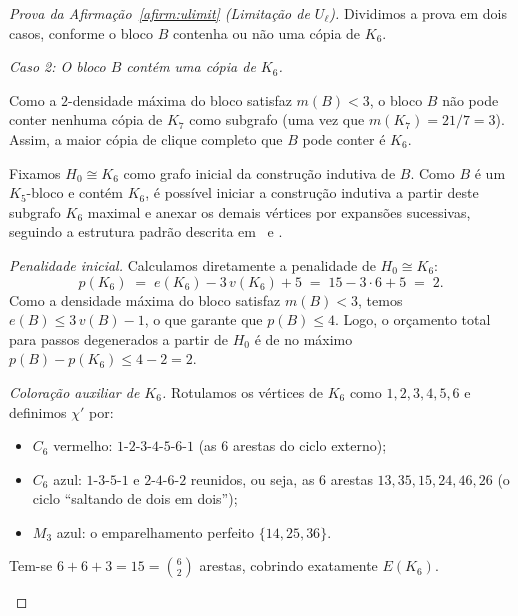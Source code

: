 \documentclass[reqno, 12pt]{amsart}
\numberwithin{equation}{section}
\theoremstyle{plain}
\theoremstyle{definition}
\newcommand{\maxdens}{m}
\begin{document}
\begin{proof}[Prova da Afirmação~\ref{afirm:ulimit} (Limitação de $U_\ell$)]
    Dividimos a prova em dois casos, conforme o bloco $B$ contenha ou não uma cópia de $K_6$.

    \medskip
    \noindent\textit{Caso 2: O bloco $B$ contém uma cópia de $K_6$.}

    \medskip

    Como a $2$-densidade máxima do bloco satisfaz $\maxdens(B) < 3$, o bloco $B$ não pode conter nenhuma cópia de $K_7$ como subgrafo (uma vez que $m(K_7) = 21/7 = 3$). Assim, a maior cópia de clique completo que $B$ pode conter é $K_6$.

    Fixamos $H_0 \cong K_6$ como grafo inicial da construção indutiva de $B$. Como $B$ é um $K_5$-bloco e contém $K_6$, é possível iniciar a construção indutiva a partir deste subgrafo $K_6$ maximal e anexar os demais vértices por expansões sucessivas, seguindo a estrutura padrão descrita em~\cite{nenadov2017algorithmic} e \cite{AntiComplete}.

    \medskip
    \noindent\textit{Penalidade inicial.}
    Calculamos diretamente a penalidade de $H_0 \cong K_6$:
    \[
        p(K_6) \;=\; e(K_6) - 3\,v(K_6) + 5 \;=\; 15 - 3 \cdot 6 + 5 \;=\; 2.
    \]
    Como a densidade máxima do bloco satisfaz $\maxdens(B) < 3$, temos $e(B) \le 3\,v(B) - 1$, o que garante que $p(B) \le 4$. Logo, o orçamento total para passos degenerados a partir de $H_0$ é de no máximo $p(B) - p(K_6) \le 4 - 2 = 2$.

    \medskip
    \noindent\textit{Coloração auxiliar de $K_6$.}
    Rotulamos os vértices de $K_6$ como $1, 2, 3, 4, 5, 6$ e definimos $\chi'$ por:
    \begin{itemize}
        \item $C_6$ vermelho: $1\text{-}2\text{-}3\text{-}4\text{-}5\text{-}6\text{-}1$
              (as $6$ arestas do ciclo externo);
        \item $C_6$ azul: $1\text{-}3\text{-}5\text{-}1$ e $2\text{-}4\text{-}6\text{-}2$
              reunidos, ou seja, as $6$ arestas $13, 35, 15, 24, 46, 26$
              (o ciclo ``saltando de dois em dois'');
        \item $M_3$ azul: o emparelhamento perfeito $\{14, 25, 36\}$.
    \end{itemize}
    Tem-se $6 + 6 + 3 = 15 = \binom{6}{2}$ arestas, cobrindo exatamente $E(K_6)$.

    \medskip

    \begin{center}
        \begin{tikzpicture}[scale=1.2,
                vm/.style={draw=red!70!black, very thick},
                az/.style={draw=blue!70!black, very thick, dashed},
                vert/.style={circle, fill=black, inner sep=1.8pt}]


\end{tikzpicture}
\end{center}
\end{proof}
\end{document}
